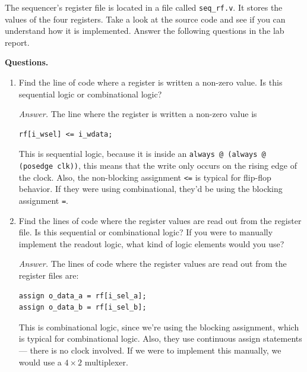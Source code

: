 \documentclass[10pt,letterpaper]{article}
\begin{document}
The sequencer’s register file is located in a file called \texttt{seq\_rf.v}. It stores the values of the four registers. Take a look at the source code and see if you can understand how it is implemented. Answer the following questions in the lab report.



\textbf{Questions.}
\begin{enumerate}
    \item Find the line of code where a register is written a non-zero value. Is this sequential logic or combinational logic?

    \textit{Answer.} The line where the register is written a non-zero value is\\
    \begin{mdframed}
    \begin{verbatim}
rf[i_wsel] <= i_wdata;
    \end{verbatim}
    \end{mdframed}

    This is sequential logic, because it is inside an \verb|always @ (always @ (posedge clk))|, this means that the write only occurs on the rising edge of the clock. Also, the non-blocking assignment \verb|<=| is typical for flip-flop behavior. If they were using combinational, they'd be using the blocking assignment \verb|=|.
    
    \item Find the lines of code where the register values are read out from the register file. Is this sequential or combinational logic? If you were to manually implement the readout logic, what kind of logic elements would you use?

    \textit{Answer.} The lines of code where the register values are read out from the register files are:\\

    \begin{mdframed}
    \begin{verbatim}
assign o_data_a = rf[i_sel_a];
assign o_data_b = rf[i_sel_b];
    \end{verbatim}
    \end{mdframed}

    This is combinational logic, since we're using the blocking assignment, which is typical for combinational logic. Also, they use continuous assign statements — there is no clock involved. If we were to implement this manually, we would use a $4\times 2$ multiplexer.
    

\end{enumerate}
\end{document}
